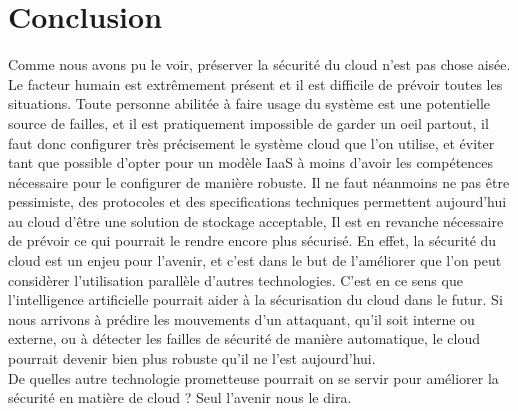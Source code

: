 \documentclass[a4paper, 12pt]{article}
\begin{document}
  \section{Conclusion}
    Comme nous avons pu le voir, préserver la sécurité du cloud n'est pas chose
    aisée. Le facteur humain est extrêmement présent et il est difficile de
    prévoir toutes les situations. Toute personne abilitée à faire usage du
    système est une potentielle source de failles, et il est pratiquement
    impossible de garder un oeil partout, il faut donc configurer très
    précisement le système cloud que l'on utilise, et éviter tant que possible
    d'opter pour un modèle IaaS à moins d'avoir les compétences nécessaire pour
    le configurer de manière robuste. Il ne faut néanmoins ne pas être
    pessimiste, des protocoles et des specifications techniques permettent
    aujourd'hui au cloud d'être une solution de stockage acceptable, Il est en
    revanche nécessaire de prévoir ce qui pourrait le rendre encore plus
    sécurisé. En effet, la sécurité du cloud est un enjeu pour l'avenir, et
    c'est dans le but de l'améliorer que l'on peut considèrer l'utilisation
    parallèle d'autres technologies. C'est en ce sens que l'intelligence
    artificielle pourrait aider à la sécurisation du cloud dans le futur. Si
    nous arrivons à prédire les mouvements d'un attaquant, qu'il soit interne ou
    externe, ou à détecter les failles de sécurité de manière automatique, le
    cloud pourrait devenir bien plus robuste qu'il ne l'est aujourd'hui. \\

    De quelles autre technologie prometteuse pourrait on se servir pour
    améliorer la sécurité en matière de cloud ? Seul l'avenir nous le dira.
\end{document}
